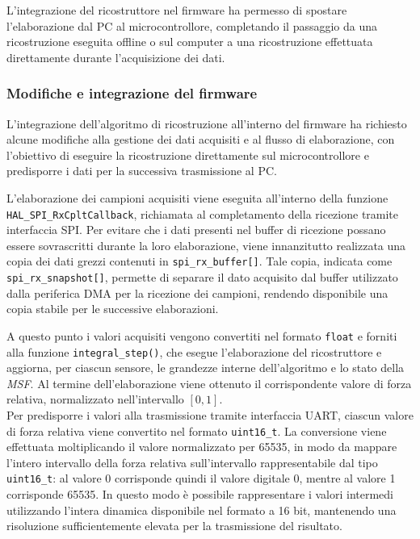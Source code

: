 \documentclass[10pt, a4paper]{article}
\begin{document}
                L'integrazione del ricostruttore nel firmware ha permesso di spostare l'elaborazione dal PC al microcontrollore, completando il passaggio da una 
                ricostruzione eseguita offline o sul computer a una ricostruzione effettuata direttamente durante l'acquisizione dei dati.
                
                

            \subsubsection{Modifiche e integrazione del firmware}
                L'integrazione dell'algoritmo di ricostruzione all'interno del firmware ha richiesto alcune modifiche alla gestione dei dati acquisiti e al 
                flusso di elaborazione, con l'obiettivo di eseguire la ricostruzione direttamente sul microcontrollore e predisporre i dati per la successiva 
                trasmissione al PC.

                L'elaborazione dei campioni acquisiti viene eseguita all'interno della funzione \texttt{HAL\_SPI\_RxCpltCallback}, richiamata al completamento 
                della ricezione tramite interfaccia SPI. Per evitare che i dati presenti nel buffer di ricezione possano essere sovrascritti durante la loro 
                elaborazione, viene innanzitutto realizzata una copia dei dati grezzi contenuti in \texttt{spi\_rx\_buffer[]}. Tale copia, indicata come 
                \texttt{spi\_rx\_snapshot[]}, permette di separare il dato acquisito dal buffer utilizzato dalla periferica DMA per la ricezione dei campioni, rendendo
                disponibile una copia stabile per le successive elaborazioni.

                A questo punto i valori acquisiti vengono convertiti nel formato \texttt{float} e forniti alla funzione \texttt{integral\_step()}, che esegue 
                l'elaborazione del ricostruttore e aggiorna, per ciascun sensore, le grandezze interne dell'algoritmo e lo stato della \textit{MSF}. 
                Al termine dell'elaborazione viene ottenuto il corrispondente
                valore di forza relativa, normalizzato nell'intervallo $[0,1]$.\\

                Per predisporre i valori alla trasmissione tramite interfaccia UART, ciascun valore di forza relativa viene convertito nel formato
                \texttt{uint16\_t}. La conversione viene effettuata moltiplicando il valore normalizzato per 65535, in modo da mappare l'intero intervallo
                della forza relativa sull'intervallo rappresentabile dal tipo \texttt{uint16\_t}: al valore 0 corrisponde quindi il valore digitale 0, mentre al valore
                1 corrisponde 65535. In questo modo è possibile rappresentare i valori intermedi utilizzando l'intera dinamica disponibile nel formato a 16 bit, mantenendo
                una risoluzione sufficientemente elevata per la trasmissione del risultato.
\end{document}
